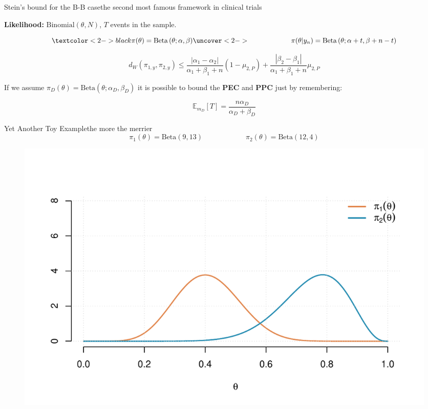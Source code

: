 \documentclass[9 pt]{beamer}
\begin{document}
\begin{frame}{Stein's bound for the B-B case}{the second most famous framework in clinical trials}

\textbf{Likelihood:} $\text{Binomial}(\theta, N)$, $T$ events in the sample.


\[ \textcolor<2->{black}{
\pi(\theta) =  \text{Beta}\left(\theta; \alpha, \beta \right)} 
\uncover<2-> {
\qquad \qquad \qquad 
\pi(\theta |y_n) = \text{Beta}\left(\theta; \alpha + t, \beta + n - t \right)}\]

\pause
\pause

\[ d_W(\pi_{1,y}, \pi_{2,y}) \leq \frac{|\alpha_1-\alpha_2|}{\alpha_1 + \beta_1 + n} (1-\mu_{2,P}) + \frac{|\beta_2-\beta_1|}{\alpha_1 + \beta_1 + n}\mu_{2,P}  \]


\pause

\vspace{0.5cm}

If we assume $\pi_D(\theta) = \text{Beta}(\theta; \alpha_D, \beta_D)$ it is possible to bound the \textbf{\color{light} PEC} and \textbf{\color{light}PPC} just by remembering: 

\[\mathbb{E}_{m_D}[T] = \frac{n\alpha_D}{\alpha_D + \beta_D}\]

\end{frame}


\begin{frame}{Yet Another Toy Example}{the more the merrier}
\[\pi_1(\theta) = \text{Beta}(9,  13) \qquad\qquad\qquad \pi_2(\theta) = \text{Beta}(12,4 )\]
\begin{figure}
    \centering
    \includegraphics[width = 1\textwidth]{images/plot_priors3.pdf}
\end{figure}
    
\end{frame}
\end{document}
